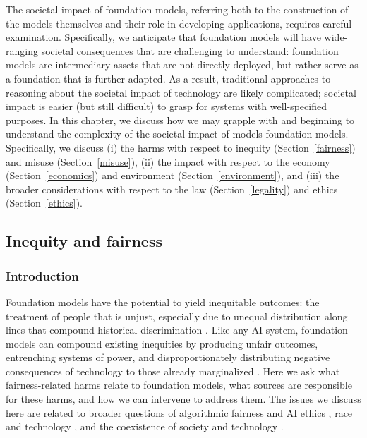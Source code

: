 The societal impact of foundation models, referring both to the construction of the models themselves and their role in developing applications, requires careful examination. Specifically, we anticipate that foundation models will have wide-ranging societal consequences that are challenging to understand: foundation models are intermediary assets that are not directly deployed, but rather serve as a foundation that is further adapted. As a result, traditional approaches to reasoning about the societal impact of technology are likely complicated; societal impact is easier (but still difficult) to grasp for systems with well-specified purposes. In this chapter, we discuss how we may grapple with and beginning to understand the complexity of the societal impact of models foundation models. Specifically, we discuss (i) the harms with respect to inequity (Section~\ref{fairness}) and misuse (Section~\ref{misuse}), (ii) the impact with respect to the economy (Section~\ref{economics}) and environment (Section~\ref{environment}), and (iii) the broader considerations with respect to the law (Section~\ref{legality}) and ethics (Section~\ref{ethics}). 


\newsection
\subsection{Inequity and fairness}
\label{sec:fairness}

\subsubsection{Introduction}
\label{sec:fairness-introduction}
Foundation models have the potential to yield inequitable outcomes: the treatment of people that is unjust, especially due to unequal distribution along lines that compound historical discrimination \citep{Hellman2021Big}. Like any AI system, foundation models can compound existing inequities by producing unfair outcomes, entrenching systems of power, and disproportionately distributing negative consequences of technology to those already marginalized \citep{sweeney2013,kay2015,buolamwini2018gender,benjamin2019,ajunwa2019paradox,datafeminism,crawford2021}. Here we ask what fairness-related harms relate to foundation models, what sources are responsible for these harms, and how we can intervene to address them. The issues we discuss here are related to broader questions of algorithmic fairness and AI ethics \citep{CorbettDavies2018, Chouldechova2020, Hellman2020, Johnson2020, fazelpour2021bias}, race and technology \cite{benjamin2019, Hanna2020, Gebru2021, field2021}, and the coexistence of society and technology \citep{Abebe2020}.

